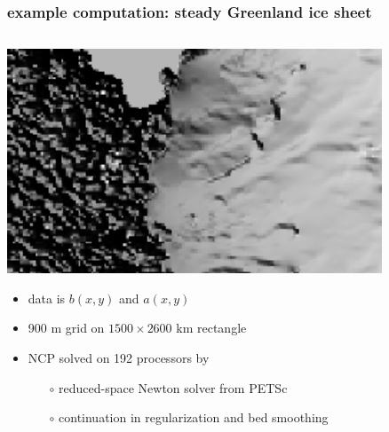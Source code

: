 \documentclass[hide notes,intlimits]{beamer}
\begin{document}
\begin{frame}
  \frametitle{example computation: steady Greenland ice sheet}
\begin{columns}
\begin{column}{0.6\textwidth}
\includegraphics[width=1.05\textwidth]{insetinset}
\vfill
\begin{itemize}
\item data is $b(x,y)$ and $a(x,y)$
\item 900 m grid on $1500\times 2600$ km rectangle
\item NCP solved on 192 processors by
  \begin{itemize}
  \item[$\circ$] reduced-space Newton solver from PETSc
  \item[$\circ$] continuation in regularization and bed smoothing
  \end{itemize}
\end{itemize}
\end{column}
\begin{column}{0.4\textwidth}

\end{column}
\end{columns}
\end{frame}
\end{document}

